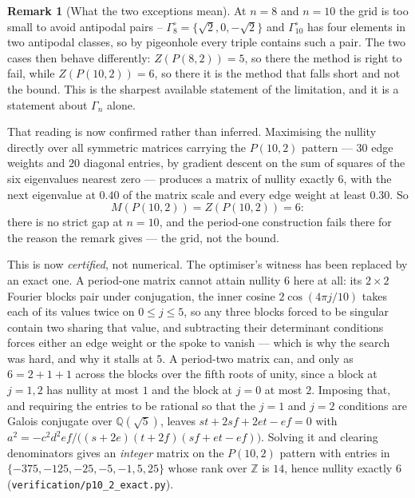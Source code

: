 \documentclass[11pt]{article}
\theoremstyle{definition}
\newtheorem{remark}[theorem]{Remark}
\begin{document}
\begin{remark}[What the two exceptions mean]\label{rem:twoexc}
At $n=8$ and $n=10$ the grid is too small to avoid antipodal pairs --
$\Gamma^{\circ}_8=\{\sqrt2,0,-\sqrt2\}$ and $\Gamma^{\circ}_{10}$ has four
elements in two antipodal classes, so by pigeonhole every triple contains such
a pair. The two cases then behave differently: $Z(P(8,2))=5$, so there the
method is right to fail, while $Z(P(10,2))=6$, so there it is the method that
falls short and not the bound. This is the sharpest available statement of the
limitation, and it is a statement about $\Gamma_n$ alone.

That reading is now confirmed rather than inferred. Maximising the nullity
directly over all symmetric matrices carrying the $P(10,2)$ pattern --- $30$ edge
weights and $20$ diagonal entries, by gradient descent on the sum of squares of
the six eigenvalues nearest zero --- produces a matrix of nullity exactly $6$,
with the next eigenvalue at $0.40$ of the matrix scale and every edge weight at
least $0.30$. So
\[
  M(P(10,2))=Z(P(10,2))=6 :
\]
there is no strict gap at $n=10$, and the period-one construction fails there
for the reason the remark gives --- the grid, not the bound.

This is now \emph{certified}, not numerical. The optimiser's witness has been
replaced by an exact one. A period-one matrix cannot attain nullity $6$ here at
all: its $2\times2$ Fourier blocks pair under conjugation, the inner cosine
$2\cos(4\pi j/10)$ takes each of its values twice on $0\le j\le5$, so any three
blocks forced to be singular contain two sharing that value, and subtracting
their determinant conditions forces either an edge weight or the spoke to
vanish --- which is why the search was hard, and why it stalls at $5$. A
period-two matrix can, and only as $6=2+1+1$ across the blocks over the fifth
roots of unity, since a block at $j=1,2$ has nullity at most $1$ and the block
at $j=0$ at most $2$. Imposing that, and requiring the entries to be rational
so that the $j=1$ and $j=2$ conditions are Galois conjugate over
$\mathbb Q(\sqrt5)$, leaves $st+2sf+2et-ef=0$ with
$a^2=-c^2d^2ef/\bigl((s+2e)(t+2f)(sf+et-ef)\bigr)$. Solving it and clearing
denominators gives an \emph{integer} matrix on the $P(10,2)$ pattern with
entries in $\{-375,-125,-25,-5,-1,5,25\}$ whose rank over $\mathbb Z$ is $14$,
hence nullity exactly $6$ (\texttt{verification/p10\_2\_exact.py}).
\end{remark}
\end{document}

